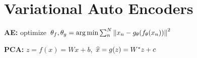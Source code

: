 \section{Variational Auto Encoders}

\textbf{AE:} optimize $\theta_f, \theta_g = \operatorname*{arg\,min} \sum_n^N \left\lVert x_n - g_\theta(f_\theta(x_n)) \right\rVert ^2$\\

\textbf{PCA:} $z = f(x) = Wx + b$, $\widehat{x} = g(z) = W^* z + c$\\

